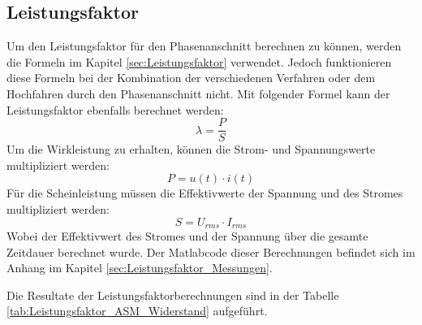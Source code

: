 \newpage
\subsection{Leistungsfaktor}
Um den Leistungsfaktor für den Phasenanschnitt berechnen zu können, werden die Formeln im Kapitel \ref{sec:Leistungsfaktor} verwendet. Jedoch funktionieren diese Formeln bei der Kombination der verschiedenen Verfahren oder dem Hochfahren durch den Phasenanschnitt nicht. Mit folgender Formel kann der Leistungsfaktor ebenfalls berechnet werden:
\begin{equation}
\lambda = \frac{P}{S}
\end{equation}
Um die Wirkleistung zu erhalten, können die Strom- und Spannungswerte multipliziert werden:
\begin{equation}
P = u(t) \cdot i(t)
\end{equation}
Für die Scheinleistung müssen die Effektivwerte der Spannung und des Stromes multipliziert werden:
\begin{equation}
S = U_{rms} \cdot I_{rms}
\end{equation}
Wobei der Effektivwert des Stromes und der Spannung über die gesamte Zeitdauer berechnet wurde. Der Matlabcode dieser Berechnungen befindet sich im Anhang im Kapitel \ref{sec:Leistungsfaktor_Messungen}. 

Die Resultate der Leistungsfaktorberechnungen sind in der Tabelle \ref{tab:Leistungsfaktor_ASM_Widerstand} aufgeführt.


